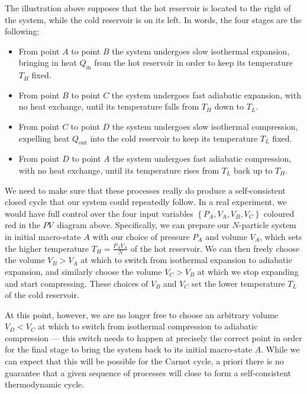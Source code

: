 The illustration above supposes that the hot reservoir is located to the right of the system, while the cold reservoir is on its left.
In words, the four stages are the following: \\[-24 pt]
\begin{itemize}
  \item From point $A$ to point $B$ the system undergoes slow isothermal expansion, bringing in heat $Q_{\text{in}}$ from the hot reservoir in order to keep its temperature $T_H$ fixed.
  \item From point $B$ to point $C$ the system undergoes fast adiabatic expansion, with no heat exchange, until its temperature falls from $T_H$ down to $T_L$.
  \item From point $C$ to point $D$ the system undergoes slow isothermal compression, expelling heat $Q_{\text{out}}$ into the cold reservoir to keep its temperature $T_L$ fixed.
  \item From point $D$ to point $A$ the system undergoes fast adiabatic compression, with no heat exchange, until its temperature rises from $T_L$ back up to $T_H$.
\end{itemize}

We need to make sure that these processes really do produce a self-consistent closed cycle that our system could repeatedly follow.
In a real experiment, we would have full control over the four input variables $\left\{P_A, V_A, V_B, V_C\right\}$ coloured red in the $PV$~diagram above. %
Specifically, we can prepare our $N$-particle system in initial macro-state $A$ with our choice of pressure $P_A$ and volume $V_A$, which sets the higher temperature $T_H = \frac{P_A V_A}{N}$ of the hot reservoir.
We can then freely choose the volume $V_B > V_A$ at which to switch from isothermal expansion to adiabatic expansion, and similarly choose the volume $V_C > V_B$ at which we stop expanding and start compressing.
These choices of $V_B$ and $V_C$ set the lower temperature $T_L$ of the cold reservoir.

At this point, however, we are no longer free to choose an arbitrary volume $V_D < V_C$ at which to switch from isothermal compression to adiabatic compression --- this switch needs to happen at precisely the correct point in order for the final stage to bring the system back to its initial macro-state $A$.
While we can expect that this will be possible for the Carnot cycle, a priori there is no guarantee that a given sequence of processes will close to form a self-consistent thermodynamic cycle.

